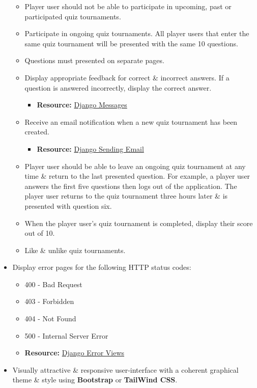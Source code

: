 \documentclass{article}
\begin{document}
\begin{itemize}
\begin{itemize}
\begin{itemize}
		\end{itemize}
		\item Player user should not be able to participate in upcoming, past or participated quiz tournaments.
		\item Participate in ongoing quiz tournaments. All player users that enter the same quiz tournament will be presented with the same 10 questions.
		\item Questions must presented on separate pages.
		\item Display appropriate feedback for correct \& incorrect answers. If a question is answered incorrectly, display the correct answer.
		\begin{itemize}
			\item \textbf{Resource:} \href{https://docs.djangoproject.com/en/3.1/ref/contrib/messages}{Django Messages}
		\end{itemize}
		\item Receive an email notification when a new quiz tournament has been created.
		\begin{itemize}
			\item \textbf{Resource:} \href{https://docs.djangoproject.com/en/3.1/topics/email}{Django Sending Email}
		\end{itemize}
		\item Player user should be able to leave an ongoing quiz tournament at any time \& return to the last presented question. For example, a player user answers the first five questions then logs out of the application. The player user returns to the quiz tournament three hours later \& is presented with question six.
		\item When the player user's quiz tournament is completed, display their score out of 10.
		\item Like \& unlike quiz tournaments.
	\end{itemize}
	\item Display error pages for the following HTTP status codes:
	\begin{itemize}
		\item 400 - Bad Request
		\item 403 - Forbidden
		\item 404 - Not Found
		\item 500 - Internal Server Error
		\item \textbf{Resource:} \href{https://docs.djangoproject.com/en/3.1/ref/views/#error-views}{Django Error Views}
	\end{itemize}
	\item Visually attractive \& responsive user-interface with a coherent graphical theme \& style using \textbf{Bootstrap} or \textbf{TailWind CSS}.

\end{itemize}
\end{document}
